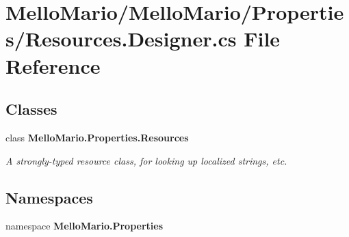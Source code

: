 \section{Mello\+Mario/\+Mello\+Mario/\+Properties/\+Resources.Designer.\+cs File Reference}
\label{Resources_8Designer_8cs}
\subsection*{Classes}
\begin{DoxyCompactItemize}
\item 
class \textbf{ Mello\+Mario.\+Properties.\+Resources}
\begin{DoxyCompactList}\small\item\em A strongly-\/typed resource class, for looking up localized strings, etc. \end{DoxyCompactList}\end{DoxyCompactItemize}
\subsection*{Namespaces}
\begin{DoxyCompactItemize}
\item 
namespace \textbf{ Mello\+Mario.\+Properties}
\end{DoxyCompactItemize}

